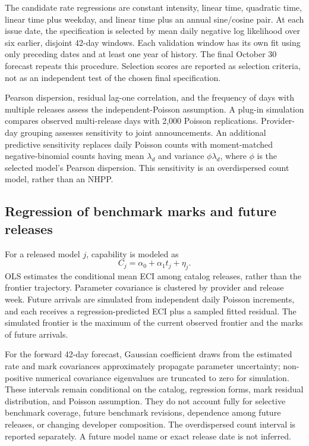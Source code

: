 The candidate rate regressions are constant intensity, linear time, quadratic time, linear time plus weekday, and linear time plus an annual sine/cosine pair. At each issue date, the specification is selected by mean daily negative log likelihood over six earlier, disjoint 42-day windows. Each validation window has its own fit using only preceding dates and at least one year of history. The final October 30 forecast repeats this procedure. Selection scores are reported as selection criteria, not as an independent test of the chosen final specification.

Pearson dispersion, residual lag-one correlation, and the frequency of days with multiple releases assess the independent-Poisson assumption. A plug-in simulation compares observed multi-release days with 2,000 Poisson replications. Provider-day grouping assesses sensitivity to joint announcements. An additional predictive sensitivity replaces daily Poisson counts with moment-matched negative-binomial counts having mean $\lambda_d$ and variance $\phi\lambda_d$, where $\phi$ is the selected model's Pearson dispersion. This sensitivity is an overdispersed count model, rather than an NHPP.

\subsection{Regression of benchmark marks and future releases}
For a released model $j$, capability is modeled as
\begin{equation}
 C_j=\alpha_0+\alpha_1t_j+\eta_j.
 \label{eq:mark-regression}
\end{equation}
OLS estimates the conditional mean ECI among catalog releases, rather than the frontier trajectory. Parameter covariance is clustered by provider and release week. Future arrivals are simulated from independent daily Poisson increments, and each receives a regression-predicted ECI plus a sampled fitted residual. The simulated frontier is the maximum of the current observed frontier and the marks of future arrivals.

For the forward 42-day forecast, Gaussian coefficient draws from the estimated rate and mark covariances approximately propagate parameter uncertainty; non-positive numerical covariance eigenvalues are truncated to zero for simulation. These intervals remain conditional on the catalog, regression forms, mark residual distribution, and Poisson assumption. They do not account fully for selective benchmark coverage, future benchmark revisions, dependence among future releases, or changing developer composition. The overdispersed count interval is reported separately. A future model name or exact release date is not inferred.

